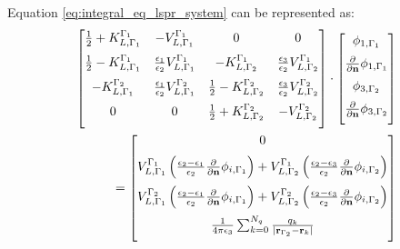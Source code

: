 %
Equation \eqref{eq:integral_eq_lspr_system} can be represented as:
%
\small
\begin{align} \label{eq:matrix_multi}
 \left[
    \begin{matrix} 
       \frac{1}{2}+K_{L, \Gamma_1}^{\Gamma_1} & -V_{L, \Gamma_1}^{\Gamma_1} & 0 &  0   \vspace{0.2cm} \\
       \frac{1}{2}-K_{L, \Gamma_1}^{\Gamma_1} & \frac{\epsilon_1}{\epsilon_2} V_{L, \Gamma_1}^{\Gamma_1} & -K_{L, \Gamma_2}^{\Gamma_1} & \frac{\epsilon_3}{\epsilon_2} V_{L, \Gamma_2}^{\Gamma_1} \vspace{0.2cm}  \\
        -K_{L, \Gamma_1}^{\Gamma_2}&\frac{\epsilon_1}{\epsilon_2} V_{L, \Gamma_1}^{\Gamma_2} & \frac{1}{2}-K_{L, \Gamma_2}^{\Gamma_2}  &  \frac{\epsilon_3}{\epsilon_2} V_{L, \Gamma_2}^{\Gamma_2} \vspace{0.2cm} \\
       0 & 0 & \frac{1}{2}+K_{L, \Gamma_2}^{\Gamma_2}&  - V_{L, \Gamma_2}^{\Gamma_2}   \vspace{0.2cm} \\
    \end{matrix}
    \right] 
\cdot
 \left[
    \begin{matrix}
    \phi_{1,\Gamma_1} \vspace{0.2cm} \\
    \frac{\partial}{\partial \mathbf{n}} \phi_{1,\Gamma_1} \vspace{0.2cm} \\
    \phi_{3,\Gamma_2} \vspace{0.2cm} \\
    \frac{\partial}{\partial \mathbf{n}} \phi_{3,\Gamma_2} \vspace{0.2cm} \\
    \end{matrix}
\right]&
 \nonumber \\
 = \left[
    \begin{matrix}
    0 \vspace{0.2cm} \\
    V_{L,\Gamma_1}^{\Gamma_1} \left(\frac{\epsilon_2-\epsilon_1}{\epsilon_2}\frac{\partial}{\partial \mathbf{n}}\phi_{i,\Gamma_1} \right)
    + V_{L,\Gamma_2}^{\Gamma_1} \left(\frac{\epsilon_2 -\epsilon_3}{\epsilon_2}\frac{\partial}{\partial \mathbf{n}}\phi_{i,\Gamma_2} \right)
    \vspace{0.2cm}\\
    V_{L,\Gamma_1}^{\Gamma_2} \left(\frac{\epsilon_2-\epsilon_1}{\epsilon_2}\frac{\partial}{\partial \mathbf{n}}\phi_{i,\Gamma_1} \right)
    + V_{L,\Gamma_2}^{\Gamma_2} \left(\frac{\epsilon_2 -\epsilon_3}{\epsilon_2}\frac{\partial}{\partial \mathbf{n}}\phi_{i,\Gamma_2} \right)
    \vspace{0.2cm}\\
    \frac{1}{4\pi\epsilon_3}\sum_{k=0}^{N_q} \frac{q_k}{|\mathbf{r}_{\Gamma_2} - \mathbf{r}_k|} \vspace{0.2cm}  \\
    \end{matrix}
\right]&
\end{align}
